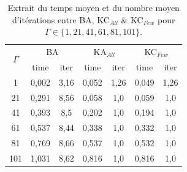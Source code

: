\documentclass[11pt,a4paper]{article}
\begin{document}
\begin{table}
    \centering
    \begin{tabular}{c|cc|cc|cc}%
        \toprule
            \multicolumn{1}{c|}{\multirow{2}{*}{$\Gamma$}} & \multicolumn{2}{c}{BA} & \multicolumn{2}{c}{KA$_{All}$} & \multicolumn{2}{c}{KC$_{Few}$}\\
                &  time  & \multicolumn{1}{c}{iter} & time  & \multicolumn{1}{c}{iter} & time  & \multicolumn{1}{c}{iter}\\
        \midrule
            1   & 0,002 & 3,16 & 0,052 & 1,26 & 0,049 & 1,26\\
            21  & 0,291 & 8,56 & 0,058 & 1,0  & 0,059 & 1,0 \\
            41  & 0,393 & 8,5  & 0,202 & 1,0  & 0,194 & 1,0 \\
            61  & 0,537 & 8,44 & 0,338 & 1,0  & 0,332 & 1,0 \\
            81  & 0,769 & 8,66 & 0,537 & 1,0  & 0,532 & 1,0 \\
            101 & 1,031 & 8,62 & 0,816 & 1,0  & 0,816 & 1,0 \\
        \bottomrule
    \end{tabular}
    \caption{Extrait du temps moyen et du nombre moyen d'itérations entre BA, KC$_{All}$ \& KC$_{Few}$ pour $\Gamma\in\{1, 21, 41, 61, 81, 101\}$.}
    \label{tb:exp4_recap_all_few}
\end{table}
\end{document}
